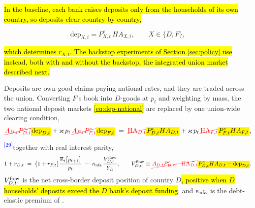 \documentclass[11pt]{article}
\newcommand{\E}{\mathbb{E}}
\newcommand{\A}[1]{\hl{#1}}
\newcommand{\Am}[1]{\mathchoice
  {{\setlength{\fboxsep}{1pt}\colorbox{yellow}{$\displaystyle #1$}}}
  {{\setlength{\fboxsep}{1pt}\colorbox{yellow}{$\textstyle #1$}}}
  {{\setlength{\fboxsep}{1pt}\colorbox{yellow}{$\scriptstyle #1$}}}
  {{\setlength{\fboxsep}{1pt}\colorbox{yellow}{$\scriptscriptstyle #1$}}}}
\newcommand{\Dm}[1]{{\color{red}\cancel{#1}}}
\newcommand{\chg}[1]{\textsuperscript{\textcolor{blue}{\scriptsize[#1]}}}
\newenvironment{addblock}{\colorlet{shadecolor}{yellow!60}\begin{shaded}}{\end{shaded}}
\begin{document}
\A{In the baseline, each bank raises deposits only from the households of its own country, so deposits clear country by country,}
\begin{addblock}
\vspace{-\baselineskip}
\begin{equation}
\mathrm{dep}_{X,t}=P^{c}_{X,t}\,HA_{X,t},\qquad X\in\{D,F\},
\label{eq:dep-national}
\end{equation}
\vspace{-0.7\baselineskip}
\end{addblock}
\noindent\A{which determines $r_{X,t}$. The backstop experiments of Section {\ref{sec:policy}} use instead, both with and without the backstop, the integrated union market described next.}

Deposits are own-good claims paying national rates, and they are traded across the
union. Converting $F$'s book into $D$-goods at $p_t$ and weighting by mass, the
two national deposit markets \A{\eqref{eq:dep-national}} are replaced by one union-wide clearing condition,
\begin{equation}
\Dm{A_{D,t}P^{c}_{D,t}}\Am{\mathrm{dep}_{D,t}}+\varkappa\,p_t\,\Dm{A_{F,t}P^{c}_{F,t}}\Am{\mathrm{dep}_{F,t}}
\;=\;\Dm{\mathrm{HA}_{D,t}}\Am{P^{c}_{D,t}HA_{D,t}}+\varkappa\,p_t\,\Dm{\mathrm{HA}_{F,t}}\Am{P^{c}_{F,t}HA_{F,t}},
\label{eq:mkt-dep}
\end{equation}
\chg{29}together with real interest parity,
\begin{equation}
1+r_{D,t}
\;=\;\bigl(1+r_{F,t}\bigr)\frac{\E_t\bigl[p_{t+1}\bigr]}{p_t}
\;-\;\kappa_{\rm nfa}\,\frac{V^{\rm flow}_{D,t}}{\bar Y_D},
\qquad
V^{\rm flow}_{D,t}\equiv \Dm{A_{D,t}P^{c}_{D,t}-\mathrm{HA}_{D,t}}\Am{P^{c}_{D,t}HA_{D,t}-\mathrm{dep}_{D,t}}.
\label{eq:uip}
\end{equation}
$V^{\rm flow}_{D,t}$ is the net cross-border deposit position of country $D$\A{, positive when $D$ households' deposits exceed the $D$ bank's deposit funding}, and
$\kappa_{\rm nfa}$ is the debt-elastic premium of
\citet{schmittgrohe2003closing}.
\end{document}
